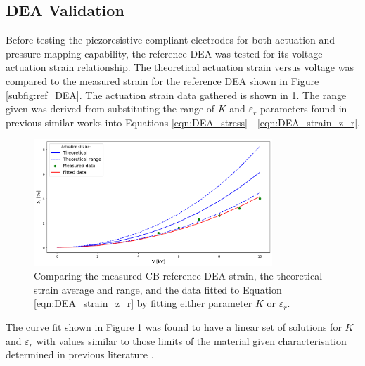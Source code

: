 \subsection{DEA Validation}
\label{subsec:dea_validation2}
Before testing the piezoresistive compliant electrodes for both actuation and pressure mapping capability, the reference DEA was tested for its voltage actuation strain relationship. The theoretical actuation strain versus voltage was compared to the measured strain for the reference DEA shown in Figure \ref{subfig:ref_DEA}. The actuation strain data gathered is shown in \ref{fig:ref_DEA_results}. The range given was derived from substituting the range of $K$ and $\varepsilon_r$ parameters found in previous similar works\cite{Liu2018, Helal2018, Huang2023} into Equations \ref{eqn:DEA_stress} - \ref{eqn:DEA_strain_z_r}.
\begin{figure}[H]
	\centering
	\includegraphics[width = 0.8\textwidth]{Figures/CB_vs_theory_range_vs_fitv2.png} %
	\vspace{0.2cm}
	\caption{Comparing the measured CB reference DEA strain, the theoretical strain average and range, and the data fitted to Equation \ref{eqn:DEA_strain_z_r} by fitting either parameter $K$ or $\varepsilon_r$.}
	\label{fig:ref_DEA_results}
\end{figure}
The curve fit shown in Figure \ref{fig:ref_DEA_results} was found to have a linear set of solutions for $K$ and $\varepsilon_r$ with values similar to those limits of the material given characterisation determined in previous literature \cite{Carpi2003} .

